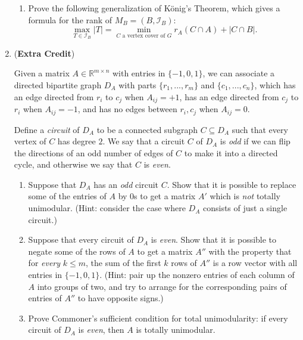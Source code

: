 \documentclass[12pt]{article}
\begin{document}
\begin{enumerate}
\begin{enumerate}
\item Prove the following generalization of K\"onig's Theorem, which gives a formula for the rank of $M_B = (B,\mathcal{I}_B)$:
\[
\max_{T \in \mathcal{I}_B} |T| = \min_{C \text{ a vertex cover of } G} r_A(C \cap A) + |C \cap B|.
\]
\end{enumerate}


\bigskip

\item ({\bf Extra Credit})


Given a matrix $A \in \mathbb{R}^{m\times n}$ with entries in $\{-1, 0, 1\}$, we can associate a directed bipartite graph $D_A$ with parts $\{r_1, ..., r_m\}$ and $\{c_1, ..., c_n\}$, which has an edge directed from $r_i$ to $c_j$ when $A_{ij} = +1$, has an edge directed from $c_j$ to $r_i$ when $A_{ij} = -1$, and has no edges between $r_i,c_j$ when $A_{ij} = 0$.

Define a \emph{circuit} of $D_A$ to be a connected subgraph $C \subseteq D_A$ such that every vertex of $C$ has degree $2$. We say that a circuit $C$ of $D_A$ is \emph{odd} if we can flip the directions of an odd number of edges of $C$ to make it into a directed cycle, and otherwise we say that $C$ is \emph{even}.

\begin{enumerate}
\item Suppose that $D_A$ has an \emph{odd} circuit $C$. Show that it is possible to replace some of the entries of $A$ by $0$s to get a matrix $A'$ which is \emph{not} totally unimodular. (Hint: consider the case where $D_A$ consists of just a single circuit.)

\item Suppose that every circuit of $D_A$ is \emph{even}. Show that it is possible to negate some of the rows of $A$ to get a matrix $A''$ with the property that for \emph{every} $k \le m$, the sum of the first $k$ rows of $A''$ is a row vector with all entries in $\{-1,0,1\}$. (Hint: pair up the nonzero entries of each column of $A$ into groups of two, and try to arrange for the corresponding pairs of entries of $A''$ to have opposite signs.)

\item Prove Commoner's sufficient condition for total unimodularity: if every circuit of $D_A$ is \emph{even}, then $A$ is totally unimodular.


\end{enumerate}
\end{enumerate}
\end{document}

